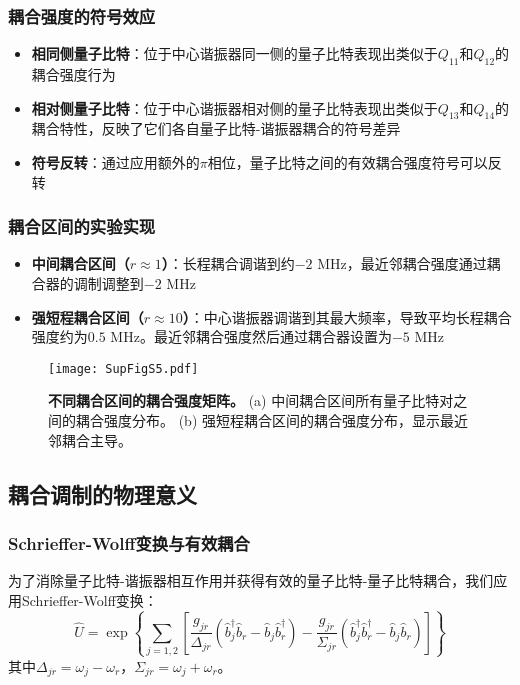 \documentclass[11pt,a4paper]{article}
\begin{document}
\subsubsection{耦合强度的符号效应}

\begin{itemize}
    \item \textbf{相同侧量子比特}：位于中心谐振器同一侧的量子比特表现出类似于$Q_{11}$和$Q_{12}$的耦合强度行为
    \item \textbf{相对侧量子比特}：位于中心谐振器相对侧的量子比特表现出类似于$Q_{13}$和$Q_{14}$的耦合特性，反映了它们各自量子比特-谐振器耦合的符号差异
    \item \textbf{符号反转}：通过应用额外的$\pi$相位，量子比特之间的有效耦合强度符号可以反转
\end{itemize}

\subsubsection{耦合区间的实验实现}

\begin{itemize}
    \item \textbf{中间耦合区间（$r \approx 1$）}：长程耦合调谐到约$-2$ MHz，最近邻耦合强度通过耦合器的调制调整到$-2$ MHz
    \item \textbf{强短程耦合区间（$r \approx 10$）}：中心谐振器调谐到其最大频率，导致平均长程耦合强度约为$0.5$ MHz。最近邻耦合强度然后通过耦合器设置为$-5$ MHz
\end{itemize}

\begin{figure}[H]
    \centering
    \texttt{[image: SupFigS5.pdf]}
    \caption{
        \textbf{不同耦合区间的耦合强度矩阵。}
        (a) 中间耦合区间所有量子比特对之间的耦合强度分布。
        (b) 强短程耦合区间的耦合强度分布，显示最近邻耦合主导。
    }
    \label{fig:coupling_matrices}
\end{figure}

\subsection{耦合调制的物理意义}

\subsubsection{Schrieffer-Wolff变换与有效耦合}

为了消除量子比特-谐振器相互作用并获得有效的量子比特-量子比特耦合，我们应用Schrieffer-Wolff变换：
\[
\hat{U} = \exp\left\{\sum_{j=1,2}\left[\frac{g_{jr}}{\Delta_{jr}}(\hat{b}^{\dagger}_j\hat{b}_r - \hat{b}_j\hat{b}^{\dagger}_r) - \frac{g_{jr}}{\Sigma_{jr}}(\hat{b}^{\dagger}_j\hat{b}^{\dagger}_r - \hat{b}_j\hat{b}_r)\right]\right\}
\]
其中$\Delta_{jr} = \omega_j - \omega_r$，$\Sigma_{jr} = \omega_j + \omega_r$。
\end{document}

